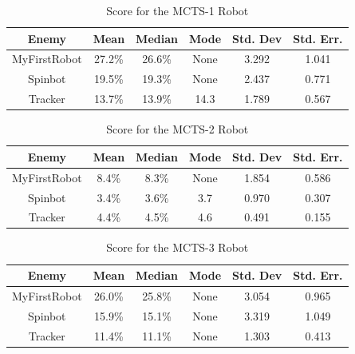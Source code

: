 \begin{table}
\begin{center}
\renewcommand{\arraystretch}{1.3}
\caption{Score for the MCTS-1 Robot}
\label{table-MCTS1-score}
\begin{tabular}{|c | c | c |c | c| c |}
\hline
Enemy & Mean & Median & Mode & Std. Dev & Std. Err.\\
\hline
MyFirstRobot & 27.2\% & 26.6\% & None & 3.292 & 1.041\\
\hline
Spinbot & 19.5\% & 19.3\% & None & 2.437 & 0.771 \\
\hline
Tracker & 13.7\% & 13.9\% & 14.3 & 1.789 & 0.567 \\
\hline
\end{tabular}
\end{center}
\end{table}

\begin{table}
\begin{center}
\renewcommand{\arraystretch}{1.3}
\caption{Score for the MCTS-2 Robot}
\label{table-MCTS2-score}
\begin{tabular}{|c | c | c |c | c| c |}
\hline
Enemy & Mean & Median & Mode & Std. Dev & Std. Err.\\
\hline
MyFirstRobot & 8.4\% & 8.3\% & None & 1.854 & 0.586\\
\hline
Spinbot & 3.4\% & 3.6\% & 3.7 & 0.970 & 0.307  \\
\hline
Tracker & 4.4\% & 4.5\% & 4.6 & 0.491 & 0.155 \\
\hline
\end{tabular}
\end{center}
\end{table}

\begin{table}
\begin{center}
\renewcommand{\arraystretch}{1.3}
\caption{Score for the MCTS-3 Robot}
\label{table-MCTS3-score}
\begin{tabular}{|c | c | c |c | c| c |}
\hline
Enemy & Mean & Median & Mode & Std. Dev & Std. Err.\\
\hline
MyFirstRobot & 26.0\% & 25.8\% & None & 3.054 & 0.965\\
\hline
Spinbot & 15.9\% & 15.1\% & None & 3.319 & 1.049  \\
\hline
Tracker & 11.4\% & 11.1\% & None & 1.303 & 0.413 \\
\hline
\end{tabular}
\end{center}
\end{table}

